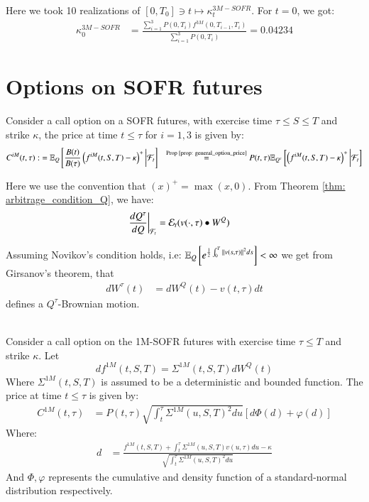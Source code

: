 Here we took 10 realizations of $[0,T_{0}] \ni t \mapsto \kappa_{t}^{3M-SOFR}$. For $t=0$, we got: 
\begin{align*}
\kappa_{0}^{3M-SOFR} &= 
\frac{
\sum_{i=1}^{3}P(0,T_{i})f^{3M}(0,T_{i-1}, T_{i})
}{
\sum_{i=1}^{3}P(0,T_{i})
}
= 
0.04234
\end{align*}





\newpage 

\section{Options on SOFR futures}

Consider a call option on a SOFR futures, with exercise time $\tau \leq S \leq T$ and strike $\kappa$, the price at time $t \leq \tau$ for $i=1,3$ is given by:
\begin{align*}
C^{iM}(t,\tau) :&= \mathbb{E}_{Q}\left[
\frac{B(t)}{B(\tau)}\left(
f^{iM}(t,S,T) - \kappa
\right)^{+}
\bigg{|}\mathcal{F}_{t}
\right]  
&\stackrel{\text{Prop \ref{prop: general_option_price}}}{=} 
P(t,\tau)\mathbb{E}_{Q^{\tau}}\left[
\left(f^{iM}(t,S,T) - \kappa
\right)^{+}
\bigg{|}\mathcal{F}_{t}
\right]
\end{align*} 

Here we use the convention that $(x)^{+} = \max(x,0)$. From Theorem \ref{thm: arbitrage_condition_Q}, we have: 
\begin{align*}
\frac{dQ^{\tau}}{dQ}\bigg{|}_{\mathcal{F}_{t}} &= \mathcal{E}_{t}(v(\cdot, \tau)\bullet W^{Q})
\end{align*} 

Assuming Novikov's condition holds, i.e: $\mathbb{E}_{Q}\left[e^{\frac{1}{2}\int_{0}^{T}\norm{v(s,\tau)}^{2}ds}\right] < \infty$ we get from Girsanov's theorem, that
\begin{align*}
dW^{\tau}(t) &= dW^{Q}(t) - v(t,\tau)dt    
\end{align*}
defines a $Q^{\tau}$-Brownian motion. 
\\~\\ 
\begin{proposition}
Consider a call option on the 1M-SOFR futures with exercise time $\tau \leq T$ and strike $\kappa$. Let 
\[
df^{1M}(t,S,T) = \Sigma^{1M}(t,S,T)dW^{Q}(t)  
\]
Where $\Sigma^{1M}(t,S,T)$ is assumed to be a deterministic and bounded function. The price at time $t\leq \tau$ is given by: 
\begin{align*}
C^{1M}(t,\tau) &= 
P(t,\tau)\sqrt{
\int_{t}^{\tau}\Sigma^{1M}(u,S,T)^{2}du
}\left[
d\Phi(d) + \varphi(d)
\right]
\end{align*}
Where: 
\begin{align*}
d &= 
\frac{
f^{1M}(t,S,T) + \int_{t}^{\tau}\Sigma^{1M}(u,S,T)v(u,\tau)du - \kappa
}{
\sqrt{
\int_{t}^{\tau}\Sigma^{1M}(u,S,T)^{2}du
}
}
\end{align*}
And $\Phi, \varphi$ represents the cumulative and density function of a standard-normal distribution respectively. 
\end{proposition}

